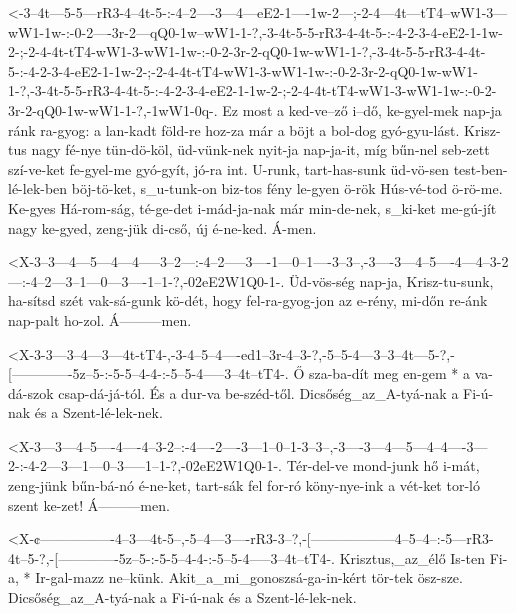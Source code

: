   {<-3--4t---5-5---rR3-4--4t-5-:-4--2----3---4---eE2-1----1w-2---;-2-4---4t---tT4--wW1-3---wW1-1w-:-0-2----3r-2---qQ0-1w--wW1-1-?,-3-4t-5-5-rR3-4-4t-5-:-4-2-3-4-eE2-1-1w-2-;-2-4-4t-tT4-wW1-3-wW1-1w-:-0-2-3r-2-qQ0-1w-wW1-1-?,-3-4t-5-5-rR3-4-4t-5-:-4-2-3-4-eE2-1-1w-2-;-2-4-4t-tT4-wW1-3-wW1-1w-:-0-2-3r-2-qQ0-1w-wW1-1-?,-3-4t-5-5-rR3-4-4t-5-:-4-2-3-4-eE2-1-1w-2-;-2-4-4t-tT4-wW1-3-wW1-1w-:-0-2-3r-2-qQ0-1w-wW1-1-?,-1wW1-0q-.}
  {  Ez most a ked-ve--ző i--dő, ke-gyel-mek nap-ja  ránk ra-gyog: a lan-kadt föld-re  hoz-za  már  a böjt a  bol-dog gyó-gyu-lást. Krisz-tus nagy fé-nye tün-dö-köl, üd-vünk-nek nyit-ja nap-ja-it, míg bűn-nel seb-zett szí-ve-ket fe-gyel-me gyó-gyít, jó-ra int. U-runk, tart-has-sunk üd-vö-sen test-ben-lé-lek-ben böj-tö-ket, s_u-tunk-on biz-tos fény le-gyen ö-rök Hús-vé-tod ö-rö-me. Ke-gyes Há-rom-ság, té-ge-det i-mád-ja-nak már min-de-nek, s_ki-ket me-gú-jít nagy ke-gyed, zeng-jük di-cső, új é-ne-ked. Á-men.}



  {<X-3--3---4---5---4---4-----3--2---:-4--2-----3----1---0--1----3--3--,-3----3---4--5----4---4--3-2---:-4--2---3--1---0---3----1--1-?,-02eE2W1Q0-1-.}
  {   Üd-vös-ség nap-ja, Krisz-tu-sunk, ha-sítsd szét vak-sá-gunk kö-dét, hogy fel-ra-gyog-jon az e-rény, mi-dőn re-ánk nap-palt ho-zol. Á---------men.}

  {<X-3-3---3--4---3---4t-tT4-,-3-4--5--4----ed1--3r-4--3-?,-5--5-4---3--3--4t---5-?,-[-------------5z--5-:-5-5--4-4-:-5--5-4-----3--4t--tT4-.}
  {   Ő sza-ba-dít meg en-gem * a va-dá-szok csap-dá-já-tól. És a dur-va be-széd-től. Dicsőség_az_A-tyá-nak a Fi-ú-nak és a Szent-lé-lek-nek.}

  {<X-3---3---4--5----4----4--3-2--:-4----2----3---1--0--1-3--3--,-3----3---4---5---4--4----3---2-:-4-2---3---1---0--3-----1--1-?,-02eE2W1Q0-1-.}
  {   Tér-del-ve mond-junk hő i-mát, zeng-jünk bűn-bá-nó é-ne-ket, tart-sák fel for-ró köny-nye-ink a vét-ket tor-ló szent ke-zet! Á---------men.}

  {<X-¢----------------4--3---4t-5--,-5--4---3----rR3-3--?,-[------------------4--5--4--:-5---rR3-4t--5-?,-[-------------5z--5-:-5-5--4-4-:-5--5-4-----3--4t--tT4-.}
  {   Krisztus,_az_élő Is-ten Fi-a, * Ir-gal-mazz ne--künk. Akit_a_mi_gonoszsá-ga-in-kért tör-tek ösz-sze. Dicsőség_az_A-tyá-nak a Fi-ú-nak és a Szent-lé-lek-nek.}

